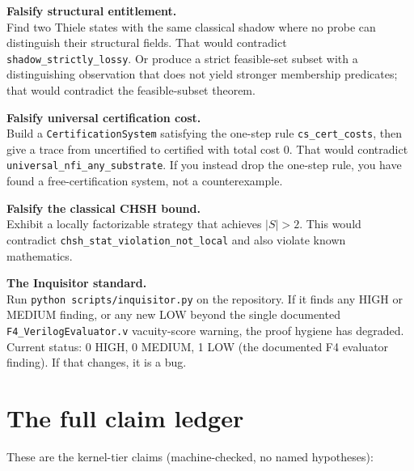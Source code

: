 \documentclass[11pt,a4paper]{article}
\theoremstyle{plain}
\theoremstyle{definition}
\theoremstyle{remark}
\begin{document}
\medskip
\noindent\textbf{Falsify structural entitlement.}\\
Find two Thiele states with the same classical shadow where no probe can distinguish their structural fields. That would contradict \texttt{shadow\_strictly\_lossy}. Or produce a strict feasible-set subset with a distinguishing observation that does not yield stronger membership predicates; that would contradict the feasible-subset theorem.

\medskip
\noindent\textbf{Falsify universal certification cost.}\\
Build a \texttt{CertificationSystem} satisfying the one-step rule \texttt{cs\_cert\_costs}, then give a trace from uncertified to certified with total cost 0. That would contradict \texttt{universal\_nfi\_any\_substrate}. If you instead drop the one-step rule, you have found a free-certification system, not a counterexample.

\medskip
\noindent\textbf{Falsify the classical CHSH bound.}\\
Exhibit a locally factorizable strategy that achieves $|S| > 2$. This would contradict \texttt{chsh\_stat\_violation\_not\_local} and also violate known mathematics.

\medskip
\noindent\textbf{The Inquisitor standard.}\\
Run \texttt{python scripts/inquisitor.py} on the repository. If it finds any HIGH or MEDIUM finding, or any new LOW beyond the single documented \texttt{F4\_VerilogEvaluator.v} vacuity-score warning, the proof hygiene has degraded. Current status: 0 HIGH, 0 MEDIUM, 1 LOW (the documented F4 evaluator finding). If that changes, it is a bug.

\section{The full claim ledger}
\label{sec:claims}

These are the kernel-tier claims (machine-checked, no named hypotheses):
\end{document}
